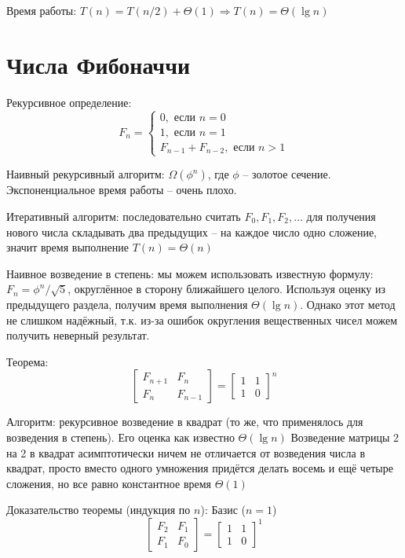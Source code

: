 \documentclass[a4paper,11pt]{article}
\begin{document}
Время работы: $T(n) = T(n/2) + \Theta(1) \Rightarrow T(n) = \Theta(\lg n)$

\section{Числа Фибоначчи}

Рекурсивное определение:
\begin{equation*}
  F_n = \begin{cases}
    0, \text{ если } n = 0 \\
    1, \text{ если } n = 1 \\
    F_{n-1} + F_{n-2}, \text{ если } n > 1
  \end{cases}
\end{equation*}

Наивный рекурсивный алгоритм: $\Omega(\phi^n)$, где $\phi$ -- золотое сечение.
Экспоненциальное время работы -- очень плохо.

Итеративный алгоритм: последовательно считать $F_0, F_1, F_2, \ldots$ для
получения нового числа складывать два предыдущих -- на каждое число одно
сложение, значит время выполнение $T(n) = \Theta(n)$

Наивное возведение в степень: мы можем использовать известную формулу: $F_n =
\phi^n / \sqrt{5}$, округлённое в сторону ближайшего целого. Используя оценку из
предыдущего раздела, получим время выполнения $\Theta(\lg n)$. Однако этот метод
не слишком надёжный, т.к. из-за ошибок округления вещественных чисел можем
получить неверный результат.

Теорема:
\begin{equation*}
\begin{bmatrix}
  F_{n+1} & F_n \\
  F_n     & F_{n-1}
\end{bmatrix} =
\begin{bmatrix}
  1 & 1 \\
  1 & 0
\end{bmatrix}^n
\end{equation*}

Алгоритм: рекурсивное возведение в квадрат (то же, что применялось для
возведения в степень). Его оценка как известно $\Theta(\lg n)$
Возведение матрицы 2 на 2 в квадрат асимптотически ничем не отличается от
возведения числа в квадрат, просто вместо одного умножения придётся делать
восемь и ещё четыре сложения, но все равно константное время $\Theta(1)$

Доказательство теоремы (индукция по $n$):
Базис ($n=1$)
\begin{equation*}
\begin{bmatrix}
  F_2 & F_1 \\
  F_1 & F_0
\end{bmatrix} =
\begin{bmatrix}
  1 & 1 \\
  1 & 0
\end{bmatrix}^1
\end{equation*}
\end{document}
